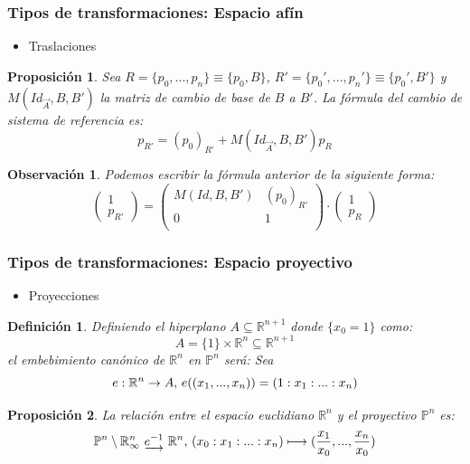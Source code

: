 \documentclass[pdf]{beamer}
\newtheorem{prop}{Proposición}
\newtheorem{obv}{Observación}
\newtheorem{defi}{Definición}
\begin{document}
\begin{frame}
	\frametitle{Tipos de transformaciones: Espacio afín}
		\begin{itemize}
		\item Traslaciones
	\end{itemize}
	\begin{prop}
		Sea $R = \{p_0,...,p_n\} \equiv \{p_0, B\}$, $R' = \{p_0',...,p_n'\} \equiv \{p_0', B'\}$ y $M(Id_{\overrightarrow{A}}, B, B')$ la matriz de cambio de base de $B$ a $B'$. La fórmula del cambio de sistema de referencia es:
		\begin{equation}
			p_{R'} = (p_0)_{R'} + M(Id_{\overrightarrow{A}}, B, B')p_R
		\end{equation}
	\end{prop}
\begin{obv}
	Podemos escribir la fórmula anterior de la siguiente forma:
	\begin{equation}\label{cambio}
		\begin{pmatrix}
			1 \\
			p_{R'}
		\end{pmatrix}
		= \begin{pmatrix}
			M(Id, B, B') & (p_0)_{R'} \\
			0 			 & 1 \\
		\end{pmatrix}\cdot \begin{pmatrix}
			1 \\
			p_R
		\end{pmatrix}
	\end{equation}
\end{obv}
\end{frame}
\begin{frame}
	\frametitle{Tipos de transformaciones: Espacio proyectivo}
	\begin{itemize}
		\item Proyecciones
	\end{itemize}
	\begin{defi}
		Definiendo el hiperplano $A \subseteq \mathbb R^{n+1}$ donde $\{x_0 = 1\}$ como:
		\begin{equation}
			A = \{1\} \times \mathbb R^n \subseteq \mathbb R^{n+1}
		\end{equation}
	el embebimiento canónico de $\mathbb R^n$ en $\mathbb P^n$ será:
	Sea \begin{equation}
		e: \mathbb R^n \rightarrow A \textup{,   } e((x_1,...,x_n)) = (1:x_1:...:x_n)
	\end{equation}
	\end{defi}

	\begin{prop}
	La relación entre el espacio euclidiano $\mathbb R^n$ y el proyectivo $\mathbb P^n$ es:
\begin{equation}\label{cambio_proyectivo}
	\mathbb P^n \setminus \mathbb R^n_{\infty} \textup{ }   \underrightarrow{e^{-1}} \textup{ }\mathbb R^n \textup{,     } (x_0:x_1:...:x_n) \longmapsto (\frac{x_1}{x_0},...,\frac{x_n}{x_0})
\end{equation}


	\end{prop}
\end{frame}
\end{document}
